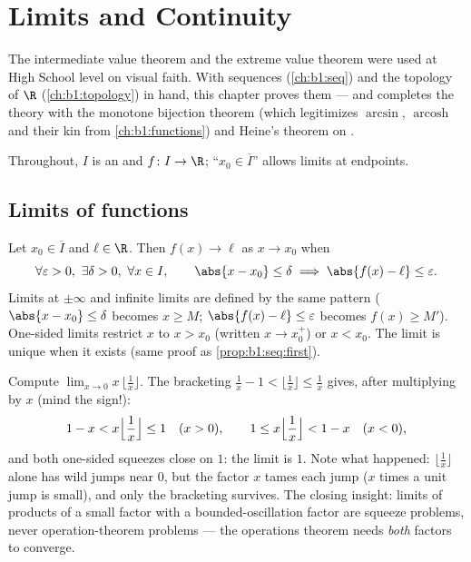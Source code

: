 \chapter{Limits and Continuity}\label{ch:b1:continuity}

The intermediate value theorem and the extreme value theorem were
used at High School level on visual faith. With sequences
(\cref{ch:b1:seq}) and the topology of $\R$ (\cref{ch:b1:topology})
in hand, this chapter proves them --- and completes the theory with
the monotone bijection theorem (which legitimizes $\arcsin$,
$\operatorname{arcosh}$ and their kin from \cref{ch:b1:functions})
and Heine's theorem on .

Throughout, $I$ is an  and $f \colon I \to \R$; ``$x_0 \in
\overline I$'' allows limits at endpoints.

\section{Limits of functions}

\begin{definition}\label{def:b1:continuity:limit}
Let $x_0 \in \overline{I}$ and $\ell \in \R$. Then $f(x) \to \ell$ as
$x \to x_0$ when
\[
\forall \varepsilon > 0,\ \exists \delta > 0,\ \forall x \in I,
\qquad \abs{x - x_0} \leq \delta \implies \abs{f(x) - \ell} \leq
\varepsilon .
\]
Limits at $\pm\infty$ and infinite limits are defined by the same
pattern ($\abs{x - x_0} \leq \delta$ becomes $x \geq M$; $\abs{f(x) -
\ell} \leq \varepsilon$ becomes $f(x) \geq M'$). One-sided limits
restrict $x$ to $x > x_0$ (written $x \to x_0^+$) or $x < x_0$. The
limit is unique when it exists (same proof as
\cref{prop:b1:seq:first}).
\end{definition}

\begin{example}\label{ex:b1:continuity:floorlimit}
Compute $\lim_{x \to 0} x\,\bigl\lfloor \frac1x \bigr\rfloor$.
The  bracketing $\frac1x - 1 < \lfloor \frac1x \rfloor \leq
\frac1x$ gives, after multiplying by $x$ (mind the sign!):
\[
1 - x < x\Bigl\lfloor \frac1x \Bigr\rfloor \leq 1 \quad (x > 0),
\qquad
1 \leq x\Bigl\lfloor \frac1x \Bigr\rfloor < 1 - x \quad (x < 0),
\]
and both one-sided squeezes close on $1$: the limit is $1$. Note
what happened: $\lfloor \frac1x\rfloor$ alone has wild jumps near
$0$, but the factor $x$ tames each jump ($x$ times a unit jump is
small), and only the bracketing survives. The closing insight:
limits of products of a small factor with a bounded-oscillation
factor are squeeze problems, never operation-theorem problems ---
the operations theorem needs \emph{both} factors to converge.
\end{example}

